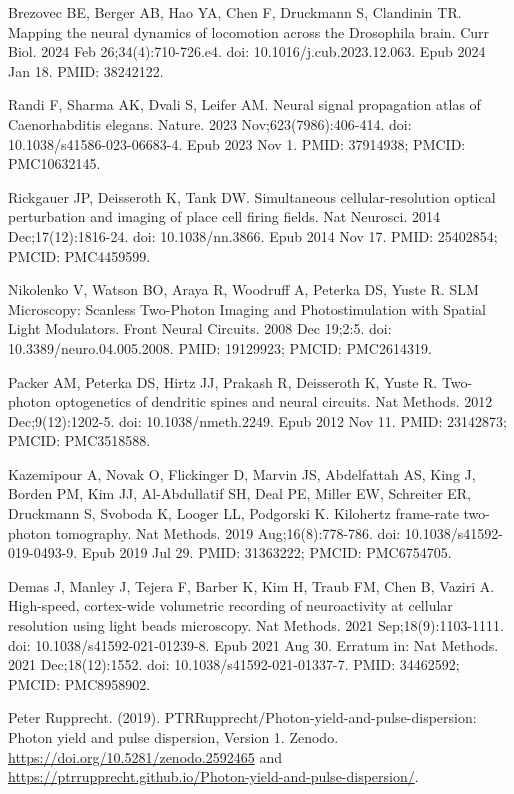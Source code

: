 \documentclass[10pt,letterpaper]{article}
\begin{document}
\begin{thebibliography}{10}
Brezovec BE, Berger AB, Hao YA, Chen F, Druckmann S, Clandinin TR. Mapping the neural dynamics of locomotion across the Drosophila brain. Curr Biol. 2024 Feb 26;34(4):710-726.e4. doi: 10.1016/j.cub.2023.12.063. Epub 2024 Jan 18. PMID: 38242122.

Randi F, Sharma AK, Dvali S, Leifer AM. Neural signal propagation atlas of Caenorhabditis elegans. Nature. 2023 Nov;623(7986):406-414. doi: 10.1038/s41586-023-06683-4. Epub 2023 Nov 1. PMID: 37914938; PMCID: PMC10632145.

Rickgauer JP, Deisseroth K, Tank DW. Simultaneous cellular-resolution optical perturbation and imaging of place cell firing fields. Nat Neurosci. 2014 Dec;17(12):1816-24. doi: 10.1038/nn.3866. Epub 2014 Nov 17. PMID: 25402854; PMCID: PMC4459599.

Nikolenko V, Watson BO, Araya R, Woodruff A, Peterka DS, Yuste R. SLM Microscopy: Scanless Two-Photon Imaging and Photostimulation with Spatial Light Modulators. Front Neural Circuits. 2008 Dec 19;2:5. doi: 10.3389/neuro.04.005.2008. PMID: 19129923; PMCID: PMC2614319.

Packer AM, Peterka DS, Hirtz JJ, Prakash R, Deisseroth K, Yuste R. Two-photon optogenetics of dendritic spines and neural circuits. Nat Methods. 2012 Dec;9(12):1202-5. doi: 10.1038/nmeth.2249. Epub 2012 Nov 11. PMID: 23142873; PMCID: PMC3518588.

Kazemipour A, Novak O, Flickinger D, Marvin JS, Abdelfattah AS, King J, Borden PM, Kim JJ, Al-Abdullatif SH, Deal PE, Miller EW, Schreiter ER, Druckmann S, Svoboda K, Looger LL, Podgorski K. Kilohertz frame-rate two-photon tomography. Nat Methods. 2019 Aug;16(8):778-786. doi: 10.1038/s41592-019-0493-9. Epub 2019 Jul 29. PMID: 31363222; PMCID: PMC6754705.

Demas J, Manley J, Tejera F, Barber K, Kim H, Traub FM, Chen B, Vaziri A. High-speed, cortex-wide volumetric recording of neuroactivity at cellular resolution using light beads microscopy. Nat Methods. 2021 Sep;18(9):1103-1111. doi: 10.1038/s41592-021-01239-8. Epub 2021 Aug 30. Erratum in: Nat Methods. 2021 Dec;18(12):1552. doi: 10.1038/s41592-021-01337-7. PMID: 34462592; PMCID: PMC8958902.

Peter Rupprecht. (2019). PTRRupprecht/Photon-yield-and-pulse-dispersion: Photon yield and pulse dispersion, Version 1. Zenodo. \url{https://doi.org/10.5281/zenodo.2592465} and \url{https://ptrrupprecht.github.io/Photon-yield-and-pulse-dispersion/}.


\end{thebibliography}
\end{document}
